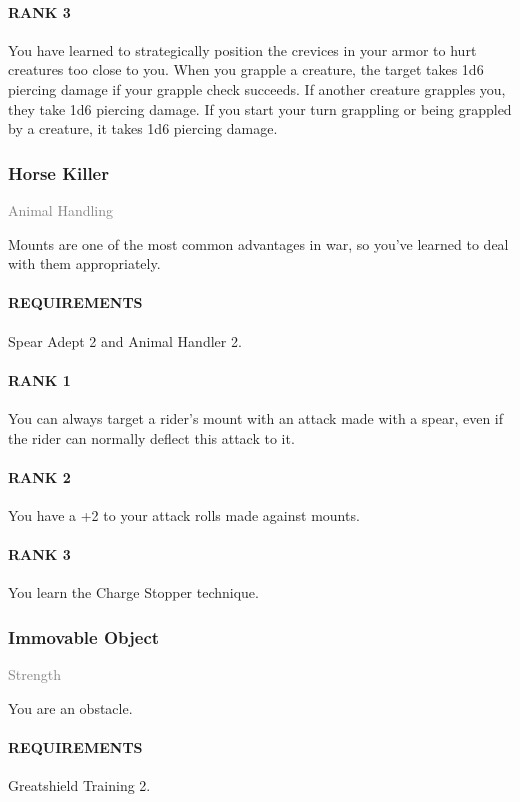 \paragraph{RANK 3} You have learned to strategically position the crevices in your armor to hurt creatures too close to you.
When you grapple a creature, the target takes 1d6 piercing damage if your grapple check succeeds.
If another creature grapples you, they take 1d6 piercing damage.
If you start your turn grappling or being grappled by a creature, it takes 1d6 piercing damage.

\subsubsection{Horse Killer} \label{feat::horsekiller}
\small{\textcolor{gray}{Animal Handling}}

\normalsize
Mounts are one of the most common advantages in war, so you've learned to deal with them appropriately.
\paragraph{REQUIREMENTS} Spear Adept 2 and Animal Handler 2.
\paragraph{RANK 1} You can always target a rider's mount with an attack made with a spear, even if the rider can normally deflect this attack to it.
\paragraph{RANK 2} You have a +2 to your attack rolls made against mounts.
\paragraph{RANK 3} You learn the Charge Stopper technique.

\subsubsection{Immovable Object} \label{feat::immovableobject}
\small{\textcolor{gray}{Strength}}

\normalsize
You are an obstacle.
\paragraph{REQUIREMENTS} Greatshield Training 2.
